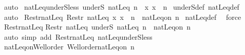 \begin{isabellebody}
\ auto%
\endisatagproof
{\isafoldproof}%
%
\isadelimproof
\isanewline
%
\endisadelimproof
\isanewline
{}\isamarkupfalse%
\ natLeq{\isacharunderscore}{\kern0pt}underS{\isacharunderscore}{\kern0pt}less{\isacharcolon}{\kern0pt}\ {\isachardoublequoteopen}underS\ natLeq\ n\ {\isacharequal}{\kern0pt}\ {\isacharbraceleft}{\kern0pt}x{\isachardot}{\kern0pt}\ x\ {\isacharless}{\kern0pt}\ n{\isacharbraceright}{\kern0pt}{\isachardoublequoteclose}\isanewline
%
\isadelimproof
%
\endisadelimproof
%
\isatagproof
{}\isamarkupfalse%
\ underS{\isacharunderscore}{\kern0pt}def\ natLeq{\isacharunderscore}{\kern0pt}def\ \isamarkupfalse%
\ auto%
\endisatagproof
{\isafoldproof}%
%
\isadelimproof
\isanewline
%
\endisadelimproof
\isanewline
{}\isamarkupfalse%
\ Restr{\isacharunderscore}{\kern0pt}natLeq{\isacharcolon}{\kern0pt}\ {\isachardoublequoteopen}Restr\ natLeq\ {\isacharbraceleft}{\kern0pt}x{\isachardot}{\kern0pt}\ x\ {\isacharless}{\kern0pt}\ n{\isacharbraceright}{\kern0pt}\ {\isacharequal}{\kern0pt}\ natLeq{\isacharunderscore}{\kern0pt}on\ n{\isachardoublequoteclose}\isanewline
%
\isadelimproof
%
\endisadelimproof
%
\isatagproof
{}\isamarkupfalse%
\ natLeq{\isacharunderscore}{\kern0pt}def\ \isamarkupfalse%
\ force%
\endisatagproof
{\isafoldproof}%
%
\isadelimproof
\isanewline
%
\endisadelimproof
\isanewline
{}\isamarkupfalse%
\ Restr{\isacharunderscore}{\kern0pt}natLeq{}{\isacharcolon}{\kern0pt}\isanewline
{\isachardoublequoteopen}Restr\ natLeq\ {\isacharparenleft}{\kern0pt}underS\ natLeq\ n{\isacharparenright}{\kern0pt}\ {\isacharequal}{\kern0pt}\ natLeq{\isacharunderscore}{\kern0pt}on\ n{\isachardoublequoteclose}\isanewline
%
\isadelimproof
%
\endisadelimproof
%
\isatagproof
{}\isamarkupfalse%
\ {\isacharparenleft}{\kern0pt}auto\ simp\ add{\isacharcolon}{\kern0pt}\ Restr{\isacharunderscore}{\kern0pt}natLeq\ natLeq{\isacharunderscore}{\kern0pt}underS{\isacharunderscore}{\kern0pt}less{\isacharparenright}{\kern0pt}%
\endisatagproof
{\isafoldproof}%
%
\isadelimproof
\isanewline
%
\endisadelimproof
\isanewline
{}\isamarkupfalse%
\ natLeq{\isacharunderscore}{\kern0pt}on{\isacharunderscore}{\kern0pt}Well{\isacharunderscore}{\kern0pt}order{\isacharcolon}{\kern0pt}\ {\isachardoublequoteopen}Well{\isacharunderscore}{\kern0pt}order{\isacharparenleft}{\kern0pt}natLeq{\isacharunderscore}{\kern0pt}on\ n{\isacharparenright}{\kern0pt}{\isachardoublequoteclose}\isanewline
%
\isadelimproof
%
\endisadelimproof
%
\isatagproof
{}\isamarkupfalse%

\end{isabellebody}

